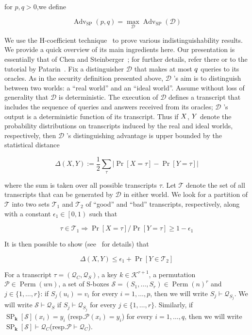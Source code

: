 for $p,q > 0$,we define

$$
\operatorname{Adv}_{\mathrm{SP}}(p, q)=\max _{\mathcal{D}} \operatorname{Adv}_{\mathrm{SP}}(\mathcal{D})
$$

We use the H-coefficient technique~\cite{SAC:Patarin08,EC:CheSte14} to prove various indistinguishability results. We provide a quick overview of its main ingredients here. Our presentation is essentially that of Chen and Steinberger~\cite{EC:CheSte14}; for further details, refer there or to the tutorial by Patarin~\cite{SAC:Patarin08}.
  Fix a distinguisher $\mathcal{D}$  that makes at most $\mathnormal{q}$ queries to its oracles. As in the security definition presented above, $\mathcal{D}$ 's  aim is to distinguish between two
worlds: a ``real world'' and an ``ideal world''. Assume without loss of generality that $\mathcal{D}$ is deterministic. The execution of $\mathcal{D}$  defines a transcript that includes the sequence of queries and answers received from its oracles; $\mathcal{D}$ 's output is a deterministic function of its transcript. Thus if $\mathnormal{X}$, $\mathnormal{Y}$ denote the probability distributions on transcripts induced by the real and ideal worlds, respectively, then $\mathcal{D}$ 's distinguishing advantage is upper bounded by the statistical distance

$$
\Delta(X, Y):=\frac{1}{2} \sum_{\tau}|\operatorname{Pr}[X=\tau]-\operatorname{Pr}[Y=\tau]|
$$

where the sum is taken over all possible transcripts $\tau$.
Let $\mathcal{T}$ denote the set of all transcripts that can be generated by $\mathcal{D}$ in either world. We look for a partition of $\mathcal{T}$  into two sets $\mathcal{T}_{1}$ and $\mathcal{T}_2$ of ``good'' and ``bad'' transcripts, respectively, along with a constant $\epsilon_{1} \in \left[0,1\right)$ such that

$$
\tau \in \mathcal{T}_{1} \Longrightarrow \operatorname{Pr}[X=\tau] / \operatorname{Pr}[Y=\tau] \geq 1-\epsilon_{1}
$$

It is then possible to show (see~\cite{EC:CheSte14} for details) that

$$
\Delta(X, Y) \leq \epsilon_{1}+\operatorname{Pr}\left[Y \in \mathcal{T}_{2}\right]
$$

For a transcript $\tau=\left(\mathcal{Q}_{C}, \mathcal{Q}_{S}\right)$, a key $k \in \mathcal{K}^{r+1}$, a permutation $\mathcal{P} \in \operatorname{Perm}( w n)$, a set of S-boxes $\mathcal{S} =\left(S_{1}, \ldots, S_{r}\right) \in \operatorname{Perm}( n)^{r}$ and $j \in \{1, \ldots, r\}$: if $S_{j}(u_{i})=v_{i}$ for every $i=1, \ldots, p$, then we will write $S_{j} \vdash \mathcal{Q}_{S_{j}}$. We will write $\mathcal{S} \vdash \mathcal{Q}_{S}$ if $S_{j} \vdash \mathcal{Q}_{S_{j}}$ for every $j \in \{1, \ldots, r\}$. Similarly, if $\operatorname{SP}_{\mathbf{k}}[\mathcal{S}]\left(x_{i}\right)=y_{i}$ (resp.$\mathcal{P}\left(x_{i}\right)=y_{i}$) for every $i=1, \ldots, q$, then we will write $\operatorname{SP}_{\mathbf{k}}[\mathcal{S}] \vdash \mathcal{Q}_{C}$(resp.$\mathcal{P} \vdash \mathcal{Q}_{C}$).\\

